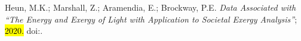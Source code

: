 \documentclass[energies,article,accept,moreauthors,pdftex]{Definitions/mdpi}\usepackage[]{graphicx}\usepackage[]{color}
\begin{document}
\begin{thebibliography}{999}
Heun, M.K.; Marshall, Z.; Aramendia, E.; Brockway, P.E.
\newblock \emph{Data Associated with ``The Energy and Exergy of Light with
  Application to Societal Exergy Analysis''};  \hl{2020.} %
  \newblock
  doi:{\href{https://doi.org/10.5518/865}{}}.%

\end{thebibliography}









\end{document}
